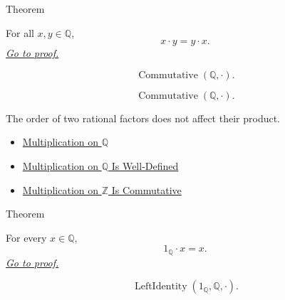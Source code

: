 \begin{theorembox}{Theorem}
\begin{theorem}
\label{thm:multiplication-on-q-commutative}
For all $x,y\in\mathbb{Q}$,
\[
x\cdot y=y\cdot x.
\]
\hyperref[prf:multiplication-on-q-commutative]{\textit{Go to proof.}}
\end{theorem}
\end{theorembox}

\begin{remark*}
\[
\operatorname{Commutative}(\mathbb{Q},\cdot).
\]
\end{remark*}

\begin{remark*}
\[
\operatorname{Commutative}(\mathbb{Q},\cdot).
\]
\end{remark*}

\begin{remark*}[Interpretation]
The order of two rational factors does not affect their product.
\end{remark*}

\begin{dependencies}
\begin{itemize}
  \item \hyperref[def:multiplication-on-q-classes]{Multiplication on $\mathbb{Q}$}
  \item \hyperref[thm:multiplication-on-q-well-defined]{Multiplication on $\mathbb{Q}$ Is Well-Defined}
  \item \hyperref[thm:multiplication-on-z-commutative]{Multiplication on $\mathbb{Z}$ Is Commutative}
\end{itemize}
\end{dependencies}

\begin{theorembox}{Theorem}
\begin{theorem}
\label{thm:one-left-multiplicative-identity-on-q}
For every $x\in\mathbb{Q}$,
\[
1_{\mathbb{Q}}\cdot x=x.
\]
\hyperref[prf:one-left-multiplicative-identity-on-q]{\textit{Go to proof.}}
\end{theorem}
\end{theorembox}

\begin{remark*}
\[
\operatorname{LeftIdentity}(1_{\mathbb{Q}},\mathbb{Q},\cdot).
\]
\end{remark*}

